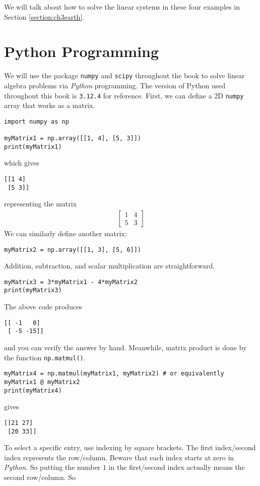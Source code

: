 We will talk about how to solve the linear systems in these four examples in Section \ref{section:ch3earth}.

\section{Python Programming}
We will use the package \texttt{numpy} and \texttt{scipy} throughout the book to solve linear algebra problems via \textit{Python} programming. The version of Python used throughout this book is \texttt{3.12.4} for reference. First, we can define a 2D \texttt{numpy} array that works as a matrix.
\begin{lstlisting}
import numpy as np

myMatrix1 = np.array([[1, 4], [5, 3]])
print(myMatrix1)
\end{lstlisting}
which gives
\begin{lstlisting}
[[1 4]
 [5 3]]
\end{lstlisting}
representing the matrix
\begin{align*}
\begin{bmatrix}
1 & 4 \\
5 & 3
\end{bmatrix}
\end{align*}
We can similarly define another matrix:
\begin{lstlisting}
myMatrix2 = np.array([[1, 3], [5, 6]])
\end{lstlisting}
Addition, subtraction, and scalar multiplication are straightforward.
\begin{lstlisting}
myMatrix3 = 3*myMatrix1 - 4*myMatrix2
print(myMatrix3)
\end{lstlisting}
The above code produces
\begin{lstlisting}
[[ -1   0]
 [ -5 -15]]
\end{lstlisting}
and you can verify the answer by hand. Meanwhile, matrix product is done by the function \texttt{np.matmul()}.
\begin{lstlisting}
myMatrix4 = np.matmul(myMatrix1, myMatrix2) # or equivalently myMatrix1 @ myMatrix2
print(myMatrix4)
\end{lstlisting}
gives
\begin{lstlisting}
[[21 27]
 [20 33]]
\end{lstlisting}
To select a specific entry, use indexing by square brackets. The first index/second index represents the row/column. Beware that each index starts at zero in \textit{Python}. So putting the number $1$ in the first/second index actually means the second row/column. So
